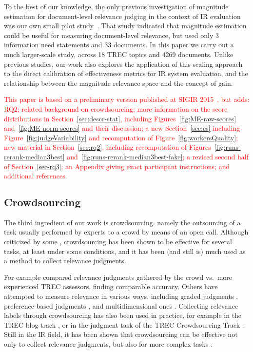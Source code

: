 To the best of our knowledge, the only previous investigation of
magnitude estimation for document-level relevance judging in the
context of IR evaluation was our own small pilot study~\cite{SchMad14,MadMiz15}.
That study indicated that 
magnitude estimation could be useful for
measuring document-level relevance, but used only 
3 information need statements and 33 documents.
In this paper we carry out a much larger-scale study, across 18 TREC
topics and 4269 documents.
Unlike previous studies, 
our work also explores the application of this scaling approach to the
direct calibration of effectiveness metrics for IR system evaluation,
and the relationship between the magnitude relevance space and the
concept of gain.

\textcolor{red}{
This paper is based on a preliminary version published at 
SIGIR 2015~\cite{ME-SIGIR15}, but adds: RQ2; 
related background on crowdsourcing;
more information on the score distributions in Section~\ref{sec:descr-stat}, including
Figures~\ref{fig:ME-raw-scores} and~\ref{fig:ME-norm-scores} and their discussion;
a new Section~\ref{sec:cs} including Figure~\ref{fig:judgeVariability} and 
recomputation of Figure~\ref{fig:workersQuality};
new material in Section~\ref{sec:rq2}, including recomputation of 
Figures~\ref{fig:runs-rerank-median3best} and~\ref{fig:runs-rerank-median3best-fake}; 
a revised second half of Section~\ref{sec-rq3}; 
an Appendix giving exact participant instructions; and
additional references.
}


\subsection{Crowdsourcing}
\label{sec:crowdsourcing}

The third ingredient of our work is crowdsourcing. 
namely the outsourcing of a task usually performed by experts to a
crowd by means of an open call. 
Although criticized by some \cite{keen2008}, crowdsourcing has been
shown to be effective for several tasks, at least under some
conditions, and
it has been (and still is) much used as a method to collect relevance
judgments. 

For example \citet{Alonso:2012} compared relevance judgments gathered
by the crowd vs.\ more experienced TREC assessors, finding comparable
accuracy. 
Others have attempted to measure relevance in various ways, including
graded judgments \cite{mccreadie:2011}, preference-based judgments
\cite{Anderton2012}, and multidimensional ones \cite{Zhang2014}.
Collecting relevance labels through crowdsourcing has also been used
in practice, for example in the TREC blog track \cite{mccreadie:2011},
or in the judgment task of the TREC Crowdsourcing Track
\cite{Smucker2014}. 
Still in the IR field, it has been shown that crowdsourcing can be
effective not only to collect relevance judgments, but also for more
complex tasks \cite{Zuccon:2013}.


